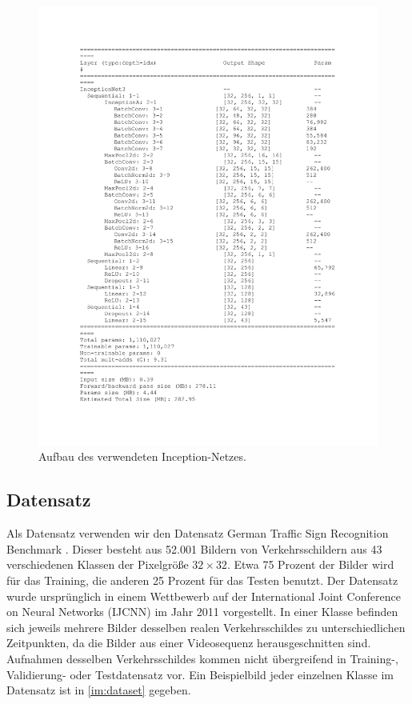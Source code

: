\documentclass[twoside, 12pt,a4paper]{book}
\numberwithin{equation}{section}
\begin{document}
	
	\begin{figure}
		\centering
		
		\centering
		\includegraphics[width=\linewidth]{inceptionNet_layout.jpg}
		
		\caption{Aufbau des verwendeten Inception-Netzes.}
		
		
		\label{im:inceptionv3layout}
	\end{figure}
	
	
	\subsection{Datensatz} \label{chapter:dataset}
	Als Datensatz verwenden wir den Datensatz German Traffic Sign Recognition Benchmark \cite{GTSRB_dataset}. Dieser besteht	aus 52.001 Bildern von Verkehrsschildern aus 43 verschiedenen Klassen der Pixelgröße $32 \times 32$. Etwa 75 Prozent der Bilder wird für das Training, die anderen 25 Prozent für das Testen benutzt. Der Datensatz wurde ursprünglich in	einem Wettbewerb auf der International Joint Conference on Neural Networks (IJCNN) im Jahr 2011 vorgestellt. In einer Klasse befinden sich jeweils mehrere Bilder desselben realen Verkehrsschildes zu unterschiedlichen Zeitpunkten, da die Bilder aus einer Videosequenz herausgeschnitten sind.  Aufnahmen desselben Verkehrsschildes kommen nicht übergreifend in Training-, Validierung- oder Testdatensatz vor. Ein Beispielbild jeder einzelnen Klasse im Datensatz ist in \autoref{im:dataset} gegeben.
	
\end{document}
